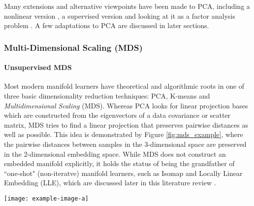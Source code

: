 Many extensions and alternative viewpoints have been made to PCA, including a nonlinear version \citep{Scholkopf1999KPCA}, a supervised version and looking at it as a factor analysis problem \citep{Tipping1999PPCA}.  A few adaptations to PCA are discussed in later sections.


\subsubsection{Multi-Dimensional Scaling (MDS)} \label{sec:MDS}

\paragraph{Unsupervised MDS} 
Most modern manifold learners have theoretical and algorithmic roots in one of three basic dimensionality reduction techniques: PCA, K-means and \textit{Multidimensional Scaling} (MDS). Whereas PCA looks for linear projection bases which are constructed from the eigenvectors of a data covariance or scatter matrix, MDS tries to find a linear projection that preserves pairwise distances as well as possible. This idea is demonstrated by Figure \ref{fig:mds_example}, where the pairwise distances between samples in the 3-dimensional space are preserved in the 2-dimensional embedding space. While MDS does not construct an embedded manifold explicitly, it holds the status of being the grandfather of ``one-shot" (non-iteratve) manifold learners, such as Isomap and Locally Linear Embedding (LLE), which are discussed later in this literature review \citep{Kegl2008PrincipalManifoldsTextbook}. 
\begin{center}
	\begin{figure*}[h]
		\centering
		\texttt{[image: example-image-a]}
		\caption[Example of MDS distance preservation.]{Example of MDS distance preservation.}
		\label{fig:mds_example}
	\end{figure*}
\end{center}

